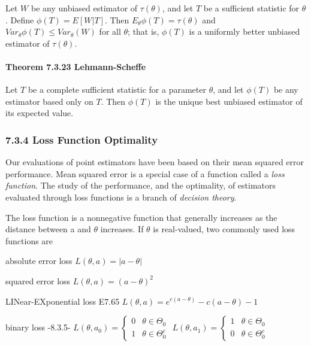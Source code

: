 \documentclass[6pt,Portrait]{article}
\let\oldparagraph\paragraph
\renewcommand{\paragraph}[1]{\oldparagraph{#1}\mbox{}}
\begin{document}
Let \(W\) be any unbiased estimator of \(\tau(\theta)\), and let \(T\)
be a sufficient statistic for \(\theta\). Define \(\phi(T)=E[W|T]\).
Then \(E_{\theta}\phi(T)=\tau(\theta)\) and
\(Var_{\theta}\phi(T)\le Var_{\theta}(W)\) for all \(\theta\); that is,
\(\phi(T)\) is a uniformly better unbiased estimator of
\(\tau(\theta)\).

\hypertarget{Lehm-Sche}{%
\paragraph{\texorpdfstring{\textbf{Theorem 7.3.23
Lehmann-Scheffe}}{Theorem 7.3.23 Lehmann-Scheffe}}\label{Lehm-Sche}}

Let \(T\) be a complete sufficient statistic for a parameter \(\theta\),
and let \(\phi(T)\) be any estimator based only on \(T\). Then
\(\phi(T)\) is the unique best unbiased estimator of its expected value.

\hypertarget{loss-function-optimality}{%
\subsubsection{7.3.4 Loss Function
Optimality}\label{loss-function-optimality}}

Our evaluations of point estimators have been based on their mean
squared error performance. Mean squared error is a special case of a
function called a \emph{loss function}. The study of the performance,
and the optimality, of estimators evaluated through loss functions is a
branch of \emph{decision theory}.

The loss function is a nonnegative function that generally increases as
the distance between a and \(\theta\) increases. If \(\theta\) is
real-valued, two commonly used loss functions are

absolute error loss \(L(\theta,a)=|a-\theta|\)

squared error loss \(L(\theta,a)=(a-\theta)^2\)

LINear-EXponential loss E7.65
\(L(\theta,a)=e^{c(a-\theta)}-c(a-\theta)-1\)

binary loss -8.3.5-
\(L(\theta,a_0)=\begin{cases}0&\theta\in\Theta_0\\1&\theta\in\Theta^c_0\end{cases}\)
\(L(\theta,a_1)=\begin{cases}1&\theta\in\Theta_0\\0&\theta\in\Theta^c_0\end{cases}\)
\end{document}
